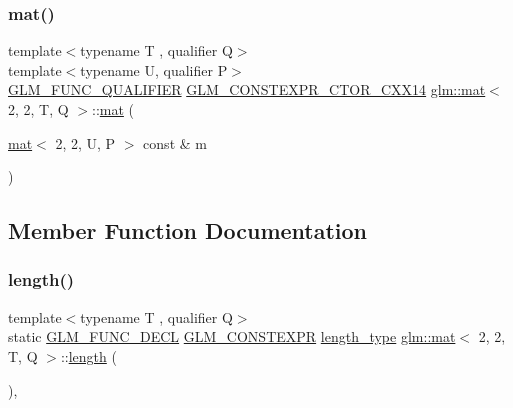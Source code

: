 \mbox{\label{structglm_1_1mat_3_012_00_012_00_01_t_00_01_q_01_4_a93387113fa262d6612cc51c980056241}} 
\subsubsection{\texorpdfstring{mat()}{mat()}\hspace{0.1cm}{\footnotesize\ttfamily [21/21]}}
{\footnotesize\ttfamily template$<$typename T , qualifier Q$>$ \\
template$<$typename U, qualifier P$>$ \\
\hyperlink{setup_8hpp_a33fdea6f91c5f834105f7415e2a64407}{G\+L\+M\+\_\+\+F\+U\+N\+C\+\_\+\+Q\+U\+A\+L\+I\+F\+I\+ER} \hyperlink{setup_8hpp_a0900f9145e68bf6061b6f5e7be3fa751}{G\+L\+M\+\_\+\+C\+O\+N\+S\+T\+E\+X\+P\+R\+\_\+\+C\+T\+O\+R\+\_\+\+C\+X\+X14} \hyperlink{structglm_1_1mat}{glm\+::mat}$<$ 2, 2, T, Q $>$\+::\hyperlink{structglm_1_1mat}{mat} (\begin{DoxyParamCaption}\item[{\hyperlink{structglm_1_1mat}{mat}$<$ 2, 2, U, P $>$ const \&}]{m }\end{DoxyParamCaption})}



\subsection{Member Function Documentation}
\mbox{\label{structglm_1_1mat_3_012_00_012_00_01_t_00_01_q_01_4_a7b681dcae80386d30308def77cd2646e}} 
\subsubsection{\texorpdfstring{length()}{length()}}
{\footnotesize\ttfamily template$<$typename T , qualifier Q$>$ \\
static \hyperlink{setup_8hpp_ab2d052de21a70539923e9bcbf6e83a51}{G\+L\+M\+\_\+\+F\+U\+N\+C\+\_\+\+D\+E\+CL} \hyperlink{setup_8hpp_a08b807947b47031d3a511f03f89645ad}{G\+L\+M\+\_\+\+C\+O\+N\+S\+T\+E\+X\+PR} \hyperlink{structglm_1_1mat_3_012_00_012_00_01_t_00_01_q_01_4_a96c65b091fc8fe8e6f5637e30c9c1f81}{length\+\_\+type} \hyperlink{structglm_1_1mat}{glm\+::mat}$<$ 2, 2, T, Q $>$\+::\hyperlink{_s_d_l__opengl__glext_8h_ab9c919755bde3b34349e23a32b4e0fa7}{length} (\begin{DoxyParamCaption}{ }\end{DoxyParamCaption})\hspace{0.3cm}{\ttfamily [inline]}, {\ttfamily [static]}}

